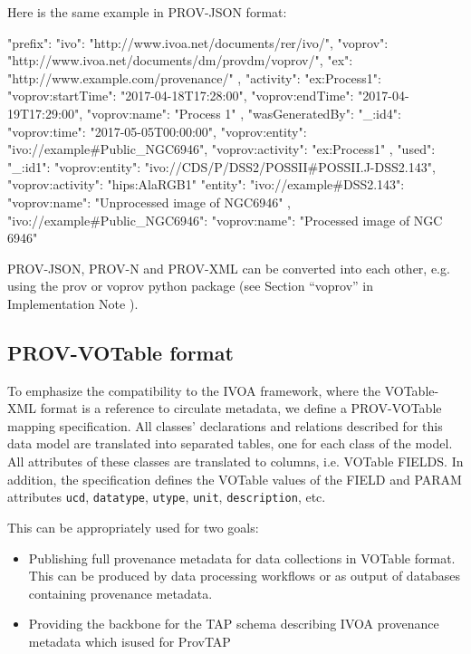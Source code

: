\noindent
Here is the same example in PROV-JSON format:
\begin{verbnobox}[\scriptsize]
{
  "prefix": {
    "ivo": "http://www.ivoa.net/documents/rer/ivo/",
    "voprov": "http://www.ivoa.net/documents/dm/provdm/voprov/",
    "ex": "http://www.example.com/provenance/"
  },
  "activity": {
    "ex:Process1": {
      "voprov:startTime": "2017-04-18T17:28:00",
      "voprov:endTime": "2017-04-19T17:29:00",
      "voprov:name": "Process 1"
    }
  },
  "wasGeneratedBy": {
    "_:id4": {
      "voprov:time": "2017-05-05T00:00:00",
      "voprov:entity": "ivo://example#Public_NGC6946",
      "voprov:activity": "ex:Process1"
    }
  },
  "used": {
    "_:id1": {
      "voprov:entity": "ivo://CDS/P/DSS2/POSSII#POSSII.J-DSS2.143",
      "voprov:activity": "hips:AlaRGB1"
    }
  }
  "entity": {
    "ivo://example#DSS2.143": {
      "voprov:name": "Unprocessed image of NGC6946"
    },
    "ivo://example#Public_NGC6946": {
      "voprov:name": "Processed image of NGC 6946"
    }
  }
}
\end{verbnobox}
\noindent
PROV-JSON, PROV-N and PROV-XML can be converted into each other, e.g.  using the prov or voprov python package (see Section ``voprov'' in Implementation Note \citep{std:ProvenanceImplementationNote}).

\subsection{PROV-VOTable format} 
To emphasize the compatibility to the IVOA framework, where the VOTable-XML
format is a reference to circulate metadata, we define a PROV-VOTable mapping
specification. All classes' declarations and relations described for this data model are translated into separated tables, one for each class of the model.
All attributes of these classes are
translated to columns, i.e. VOTable FIELDS. In addition, the specification
defines the VOTable values of the FIELD and PARAM attributes \texttt{ucd},
\texttt{datatype}, \texttt{utype}, \texttt{unit}, \texttt{description}, etc.

This can be appropriately used for two goals:
\begin{itemize}
	\item Publishing full provenance metadata for data collections in VOTable format. This can be produced by data processing workflows or as output of databases containing provenance metadata.
	\item Providing the backbone for the TAP schema describing IVOA provenance metadata which isused for ProvTAP 
\end{itemize}

